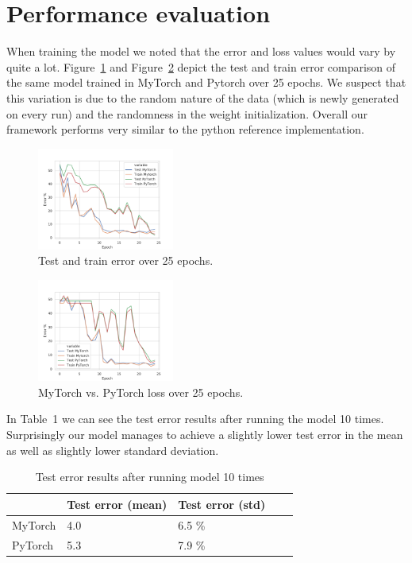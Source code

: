 \documentclass[10pt,conference,compsocconf]{IEEEtran}
\begin{document}
\section{Performance evaluation}
When training the model we noted that the error and loss values would vary by quite a lot. Figure~\ref{fig:err} and Figure~\ref{fig:err2} depict the test and train error comparison of the same model trained in MyTorch and Pytorch over 25 epochs. We suspect that this variation is due to the random nature of the data (which is newly generated on every run) and the randomness in the weight initialization. Overall our framework performs very similar to the python reference implementation.
\begin{figure}[h]
  \centering
  \includegraphics[width=0.4\textwidth]{fig/err.pdf}
  \caption{Test and train error over 25 epochs.}
  \label{fig:err}
\end{figure}

\begin{figure}[h]
  \centering
  \includegraphics[width=0.4\textwidth]{fig/err2.pdf}
  \caption{MyTorch vs. PyTorch loss over 25 epochs.}
  \label{fig:err2}
\end{figure}

In Table~1 we can see the test error results after running the model 10 times. Surprisingly our model manages to achieve a slightly lower test error in the mean as well as slightly lower standard deviation.
\begin{table}[]
    \centering
\begin{tabular}{@{}lllll@{}}
\toprule
        & Test error (mean) & Test error (std) \\ \midrule
MyTorch & 4.0               & 6.5 \%           \\
PyTorch & 5.3               & 7.9 \%          
\end{tabular}
  \caption{Test error results after running model 10 times}
\end{table}





\end{document}
